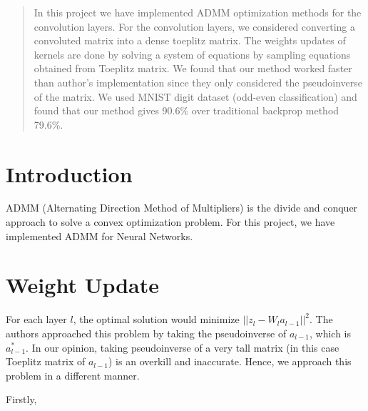 \documentclass[12pt]{article}
\begin{document}
\maketitle

\begin{abstract}
In this project we have implemented ADMM optimization methods for the convolution layers.
For the convolution layers, we considered converting a convoluted matrix into a dense toeplitz matrix.
The weights updates of kernels are done by solving a system of equations by sampling equations obtained from Toeplitz matrix.
We found that our method worked faster than author's implementation since they only considered the pseudoinverse of the matrix.
We used MNIST digit dataset (odd-even classification) and found that our method gives 90.6\% over traditional backprop method 79.6\%.
\end{abstract}

\section{Introduction}
ADMM (Alternating Direction Method of Multipliers) is the divide and conquer approach to solve a convex optimization problem.
For this project, we have implemented ADMM for Neural Networks.

\section{Weight Update}

For each layer $l$, the optimal solution would minimize $||z_l - W_l a_{l-1} ||^2$.
The authors approached this problem by taking the pseudoinverse of $a_{l-1}$, which is $a_{l-1}^*$.
In our opinion, taking pseudoinverse of a very tall matrix (in this case Toeplitz matrix of $a_{l-1}$) is an overkill and inaccurate.
Hence, we approach this problem in a different manner.

Firstly, 



\end{document}
